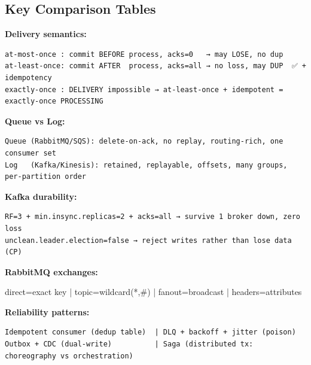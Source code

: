 \documentclass[11pt]{article}
\newenvironment{Shaded}{\begin{snugshade}}{\end{snugshade}}
\newcommand{\CommentTok}[1]{\textcolor[rgb]{0.48,0.49,0.49}{#1}}
\newcommand{\NormalTok}[1]{\textcolor[rgb]{0.81,0.81,0.76}{#1}}
\newcommand{\OperatorTok}[1]{\textcolor[rgb]{0.81,0.81,0.76}{#1}}
\begin{document}
\subsection{Key Comparison Tables}\label{key-comparison-tables}

\textbf{Delivery semantics:}

\setcodelang{}

\begin{verbatim}
at-most-once : commit BEFORE process, acks=0   → may LOSE, no dup
at-least-once: commit AFTER  process, acks=all → no loss, may DUP  ✅ + idempotency
exactly-once : DELIVERY impossible → at-least-once + idempotent = exactly-once PROCESSING
\end{verbatim}

\textbf{Queue vs Log:}

\setcodelang{}

\begin{verbatim}
Queue (RabbitMQ/SQS): delete-on-ack, no replay, routing-rich, one consumer set
Log   (Kafka/Kinesis): retained, replayable, offsets, many groups, per-partition order
\end{verbatim}

\textbf{Kafka durability:}

\setcodelang{}

\begin{verbatim}
RF=3 + min.insync.replicas=2 + acks=all → survive 1 broker down, zero loss
unclean.leader.election=false → reject writes rather than lose data (CP)
\end{verbatim}

\textbf{RabbitMQ exchanges:}


\begin{Shaded}
\begin{Highlighting}[]
\NormalTok{direct}\OperatorTok{=}\NormalTok{exact key }\OperatorTok{|}\NormalTok{ topic}\OperatorTok{=}\NormalTok{wildcard(}\OperatorTok{*}\NormalTok{,}\CommentTok{\#) | fanout=broadcast | headers=attributes}
\end{Highlighting}
\end{Shaded}

\textbf{Reliability patterns:}

\setcodelang{}

\begin{verbatim}
Idempotent consumer (dedup table)  | DLQ + backoff + jitter (poison)
Outbox + CDC (dual-write)          | Saga (distributed tx: choreography vs orchestration)
\end{verbatim}
\end{document}
